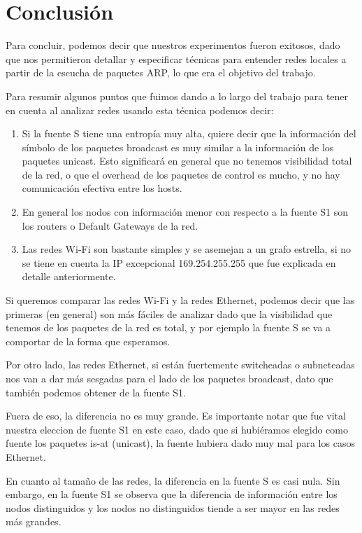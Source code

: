 \section{Conclusión}

\PARstart Para concluir, podemos decir que nuestros experimentos fueron exitosos, dado que nos permitieron detallar y especificar técnicas para entender redes locales a partir de la escucha de paquetes ARP, lo que era el objetivo del trabajo.

Para resumir algunos puntos que fuimos dando a lo largo del trabajo para tener en cuenta al analizar redes usando esta técnica podemos decir:

\begin{enumerate}
  \item Si la fuente S tiene una entropía muy alta, quiere decir que la información del símbolo de los paquetes broadcast es muy similar a la información de los paquetes unicast. Esto significará en general que no tenemos visibilidad total de la red, o que el overhead de los paquetes de control es mucho, y no hay comunicación efectiva entre los hosts.
  \item En general los nodos con información menor con respecto a la fuente S1 son los routers o Default Gateways de la red.
  \item Las redes Wi-Fi son bastante simples y se asemejan a un grafo estrella, si no se tiene en cuenta la IP excepcional 169.254.255.255 que fue explicada en detalle anteriormente.
\end{enumerate}

Si queremos comparar las redes Wi-Fi y la redes Ethernet, podemos decir que las primeras (en general) son más fáciles de analizar dado que la visibilidad que tenemos de los paquetes de la red es total, y por ejemplo la fuente S se va a comportar de la forma que esperamos.

Por otro lado, las redes Ethernet, si están fuertemente switcheadas o subneteadas nos van a dar más sesgadas para el lado de los paquetes broadcast, dato que también podemos obtener de la fuente S1.

Fuera de eso, la diferencia no es muy grande. Es importante notar que fue vital nuestra eleccion de fuente S1 en este caso, dado que si hubiéramos elegido como fuente los paquetes is-at (unicast), la fuente hubiera dado muy mal para los casos Ethernet.


En cuanto al tamaño de las redes, la diferencia en la fuente S es casi nula. Sin embargo, en la fuente S1 se observa que la diferencia de información entre los nodos distinguidos y los nodos no distinguidos tiende a ser mayor en las redes más grandes.

